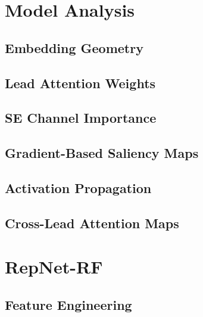 \documentclass[sigconf,nonacm]{acmart}
\begin{document}
\section{Model Analysis}
\label{sec:analysis}

\subsection{Embedding Geometry}

\subsection{Lead Attention Weights}

\subsection{SE Channel Importance}

\subsection{Gradient-Based Saliency Maps}

\subsection{Activation Propagation}

\subsection{Cross-Lead Attention Maps}


\section{RepNet-RF}
\label{sec:rf}

\subsection{Feature Engineering}
\end{document}
